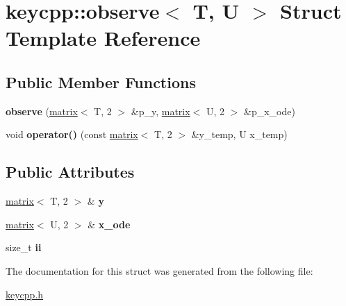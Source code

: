 \hypertarget{structkeycpp_1_1observe}{\section{keycpp\-:\-:observe$<$ T, U $>$ Struct Template Reference}
\label{structkeycpp_1_1observe}
}
\subsection*{Public Member Functions}
\begin{DoxyCompactItemize}
\item 
\hypertarget{structkeycpp_1_1observe_a6b92320b534fe90009e4f52276ff5aa3}{{\bfseries observe} (\hyperlink{classkeycpp_1_1matrix}{matrix}$<$ T, 2 $>$ \&p\-\_\-y, \hyperlink{classkeycpp_1_1matrix}{matrix}$<$ U, 2 $>$ \&p\-\_\-x\-\_\-ode)}\label{structkeycpp_1_1observe_a6b92320b534fe90009e4f52276ff5aa3}

\item 
\hypertarget{structkeycpp_1_1observe_ad7b1bca76826f4d3c96e24802406f7d1}{void {\bfseries operator()} (const \hyperlink{classkeycpp_1_1matrix}{matrix}$<$ T, 2 $>$ \&y\-\_\-temp, U x\-\_\-temp)}\label{structkeycpp_1_1observe_ad7b1bca76826f4d3c96e24802406f7d1}

\end{DoxyCompactItemize}
\subsection*{Public Attributes}
\begin{DoxyCompactItemize}
\item 
\hypertarget{structkeycpp_1_1observe_ad06476e501cfc03b9b05badb312aaf15}{\hyperlink{classkeycpp_1_1matrix}{matrix}$<$ T, 2 $>$ \& {\bfseries y}}\label{structkeycpp_1_1observe_ad06476e501cfc03b9b05badb312aaf15}

\item 
\hypertarget{structkeycpp_1_1observe_aa888e3317d737be5d8b6beaf5f80da82}{\hyperlink{classkeycpp_1_1matrix}{matrix}$<$ U, 2 $>$ \& {\bfseries x\-\_\-ode}}\label{structkeycpp_1_1observe_aa888e3317d737be5d8b6beaf5f80da82}

\item 
\hypertarget{structkeycpp_1_1observe_a26f43b79b19af889827df682270a4d57}{size\-\_\-t {\bfseries ii}}\label{structkeycpp_1_1observe_a26f43b79b19af889827df682270a4d57}

\end{DoxyCompactItemize}


The documentation for this struct was generated from the following file\-:\begin{DoxyCompactItemize}
\item 
\hyperlink{keycpp_8h}{keycpp.\-h}\end{DoxyCompactItemize}

